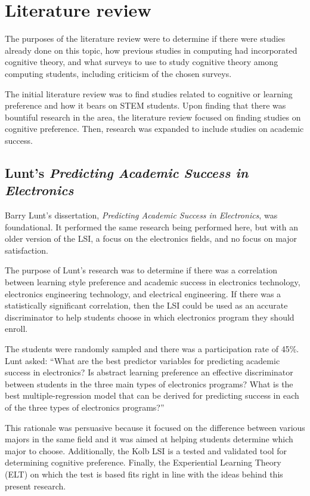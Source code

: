 \section{Literature review}
The purposes of the literature review were to determine if there were studies already done on this topic, how previous studies in computing had incorporated cognitive theory, and what surveys to use to study cognitive theory among computing students, including criticism of the chosen surveys.

The initial literature review was to find studies related to cognitive or learning preference and how it bears on STEM students. Upon finding that there was bountiful research in the area, the literature review focused on finding studies on cognitive preference. Then, research was expanded to include studies on academic success.

\subsection{Lunt's \textit{Predicting Academic Success in Electronics}}
Barry Lunt's dissertation, \textit{Predicting Academic Success in Electronics}, was foundational. It performed the same research being performed here, but with an older version of the LSI, a focus on the electronics fields, and no focus on major satisfaction.

The purpose of Lunt's research was to determine if there was a correlation between learning style preference and academic success in electronics technology, electronics engineering technology, and electrical engineering. If there was a statistically significant correlation, then the LSI could be used as an accurate discriminator to help students choose in which electronics program they should enroll.

The students were randomly sampled and there was a participation rate of 45\%. Lunt asked: ``What are the best predictor variables for predicting academic success in electronics? Is abstract learning preference an effective discriminator between students in the three main types of electronics programs? What is the best multiple-regression model that can be derived for predicting success in each of the three types of electronics programs?''\citep{lunt1996}

This rationale was persuasive because it focused on the difference between various majors in the same field and it was aimed at helping students determine which major to choose. Additionally, the Kolb LSI is a tested and validated tool for determining cognitive preference. Finally, the Experiential Learning Theory (ELT) on which the test is based fits right in line with the ideas behind this present research.

